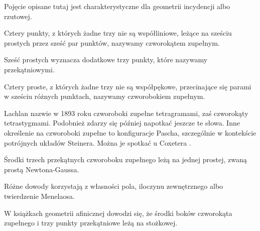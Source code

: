 Pojęcie opisane tutaj jest charakterystyczne dla geometrii incydencji albo rzutowej.

\begin{definition}
	Cztery punkty, z których żadne trzy nie są współliniowe, leżące na sześciu prostych przez sześć par punktów, nazywamy czworokątem zupełnym.
\end{definition}

Sześć prostych wyznacza dodatkowe trzy punkty, które nazywamy przekątniowymi.

\begin{definition}
	Cztery proste, z których żadne trzy nie są współpękowe, przecinające się parami w sześciu różnych punktach, nazywamy czworobokiem zupełnym.
\end{definition}

Lachlan nazwie w 1893 roku czworoboki zupełne tetragramami, zaś czworokąty tetrastygmami.
Podobnież zdarzy się później napotkać jeszcze te słowa.
%
%
%
Inne określenie na czworoboki zupełne to konfiguracje Pascha, szczególnie w kontekście potrójnych układów Steinera.
%
%
Można je spotkać u Coxetera \cite[s. 34]{coxeter_1967}.

\begin{theorem}
	Środki trzech przekątnych czworoboku zupełnego leżą na jednej prostej, zwaną prostą Newtona-Gaussa.
\end{theorem}

Różne dowody korzystają z własności pola, iloczynu zewnętrznego albo twierdzenie Menelaosa.
%
%

W książkach geometrii afinicznej dowodzi się, że środki boków czworokąta zupełnego i trzy punkty przekątniowe leżą na stożkowej.



